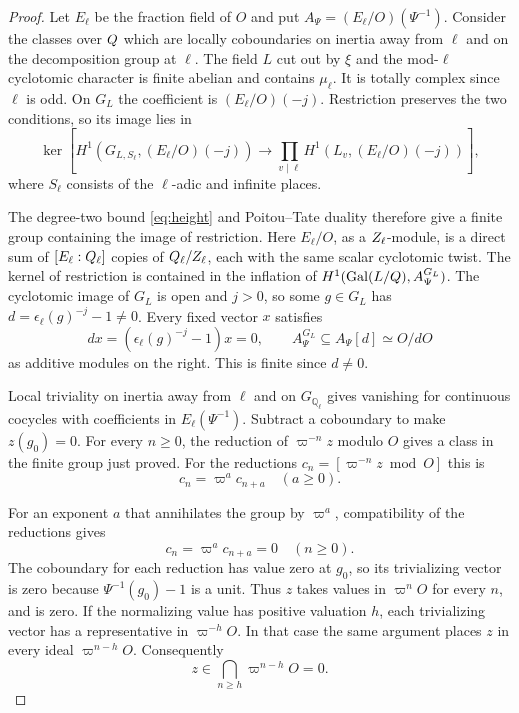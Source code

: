 \begin{proof}

Let \(E_\ell\) be the fraction field of \(O\) and put
\(A_\Psi=(E_\ell/O)(\Psi^{-1})\). Consider the classes over
\(Q\) which are locally coboundaries on inertia away from
\(\ell\) and on the decomposition group at \(\ell\). The
field \(L\) cut out by \(\xi\) and the mod-\(\ell\)
cyclotomic character is finite abelian and contains
\(\mu_\ell\). It is totally complex since \(\ell\) is odd.
On \(G_L\) the coefficient is \((E_\ell/O)(-j)\).
Restriction preserves the two conditions, so its image lies in
\[
   \ker\!\left[
      H^1(G_{L,S_\ell},(E_\ell/O)(-j))
       \longrightarrow\prod_{v\mid\ell}H^1(L_v,(E_\ell/O)(-j))
       \right],
\]
where \(S_\ell\) consists of the \(\ell\)-adic and infinite places.

The degree-two bound \eqref{eq:height} and
Poitou--Tate duality therefore give a finite group containing
the image of restriction. Here \(E_\ell/O\), as a
\(Z_\ell\)-module, is a direct sum of \([E_\ell:Q_\ell]\)
copies of \(Q_\ell/Z_\ell\), each with the same scalar
cyclotomic twist. The kernel of restriction is contained in the
inflation of
\(H^1(\operatorname{Gal}(L/Q),A_\Psi^{G_L})\).
The cyclotomic image of \(G_L\) is open and \(j>0\), so some
\(g\in G_L\) has \(d=\epsilon_\ell(g)^{-j}-1\ne0\).
Every fixed vector \(x\) satisfies
\[
 dx=(\epsilon_\ell(g)^{-j}-1)x=0,\qquad
 A_\Psi^{G_L}\subseteq A_\Psi[d]\simeq O/dO
\]
as additive modules on the right. This is finite since \(d\ne0\).

Local triviality on inertia away from \(\ell\) and on \(G_{\mathbb Q_\ell}\) gives vanishing for continuous cocycles with coefficients in \(E_\ell(\Psi^{-1})\). Subtract a
coboundary to make \(z(g_0)=0\). For every \(n\geq0\), the
reduction of \(\varpi^{-n}z\) modulo \(O\) gives a class in
the finite group just proved. For the reductions \(c_n=[\varpi^{-n}z\bmod O]\) this is
\[
               c_n=\varpi^a c_{n+a}\quad(a\ge0).
\]

For an exponent \(a\) that annihilates the group by \(\varpi^a\), compatibility of the reductions gives
\[
 c_n=\varpi^a c_{n+a}=0\quad(n\ge0).
\] The coboundary for each reduction
has value zero at \(g_0\), so its trivializing vector is zero
because \(\Psi^{-1}(g_0)-1\) is a unit. Thus \(z\) takes
values in \(\varpi^n O\) for every \(n\), and is zero. If
the normalizing value has positive valuation \(h\), each
trivializing vector has a representative in
\(\varpi^{-h}O\). In that case the same argument places \(z\)
in every ideal \(\varpi^{n-h}O\). Consequently
\[
 z\in\bigcap_{n\ge h}\varpi^{n-h}O=0.
\]


\end{proof}
